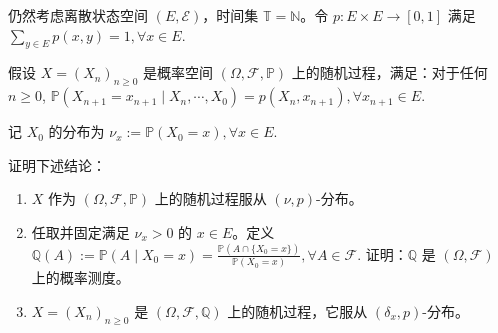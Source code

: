 \documentclass{ctexart}
\begin{document}
\begin{problem}
  仍然考虑离散状态空间 \((E,\mathcal{E})\)，时间集 \(\mathbb{T} = \mathbb{N}\)。令
  \( p : E \times E \to [0,1] \)
  满足
  \( \sum_{y \in E} p(x,y) = 1, \forall x \in E. \)

  假设
  \( X = (X_n)_{n \geq 0} \)
  是概率空间 \((\Omega,\mathcal{F},\mathbb{P})\) 上的随机过程，满足：对于任何 \(n \geq 0\),
  \( \mathbb{P}(X_{n+1}=x_{n+1}\mid X_n,\cdots,X_0) = p(X_n,x_{n+1}), \forall x_{n+1} \in E. \)

  记 \(X_0\) 的分布为
  \( \nu_x := \mathbb{P}(X_0=x), \forall x \in E. \)

  证明下述结论：
  \begin{enumerate}
    \item \(X\) 作为 \((\Omega,\mathcal{F},\mathbb{P})\) 上的随机过程服从 \((\nu,p)\)-分布。
    \item 任取并固定满足 \(\nu_x > 0\) 的 \(x \in E\)。定义
      \( \mathbb{Q}(A) := \mathbb{P}(A \mid X_0=x) = \frac{\mathbb{P}(A \cap \{X_0=x\})}{\mathbb{P}(X_0=x)}, \forall A \in \mathcal{F}. \)
      证明：\(\mathbb{Q}\) 是 \((\Omega,\mathcal{F})\) 上的概率测度。
    \item \(X=(X_n)_{n \geq 0}\) 是 \((\Omega,\mathcal{F},\mathbb{Q})\) 上的随机过程，它服从 \((\delta_x,p)\)-分布。
  \end{enumerate}
\end{problem}
\end{document}
